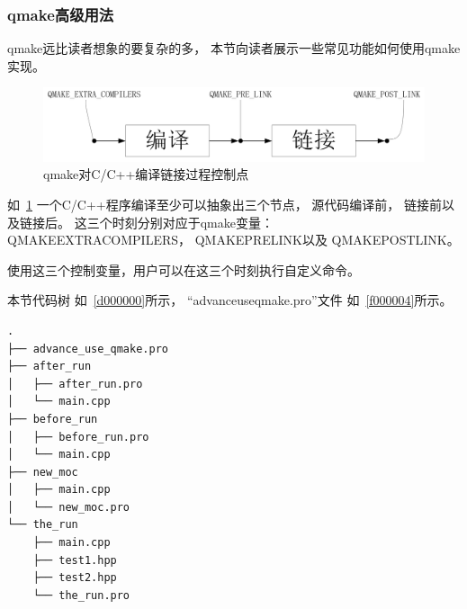
\subsubsection{
qmake高级用法
}\label{ss000810}


qmake远比读者想象的要复杂的多，
本节向读者展示一些常见功能如何使用qmake实现。


\begin{figure}[ht] %
\centering %
\includegraphics[width=\textwidth]{chapter01/images/advance_use_qmake.png} %
\caption{qmake对C/C++编译链接过程控制点} %
\label{p000002} %
\end{figure}


如\figurename\ \ref{p000002}
一个C/C++程序编译至少可以抽象出三个节点，
源代码编译前，
链接前以及链接后。
这三个时刻分别对应于qmake变量：
QMAKE\underline{\hspace{0.5em}}EXTRA\underline{\hspace{0.5em}}COMPILERS，
QMAKE\underline{\hspace{0.5em}}PRE\underline{\hspace{0.5em}}LINK以及
QMAKE\underline{\hspace{0.5em}}POST\underline{\hspace{0.5em}}LINK。

使用这三个控制变量，用户可以在这三个时刻执行自定义命令。

本节代码树
如\treeindexnumbernameone\ \ref{d000000}所示，
“advance\underline{\hspace{0.5em}}use\underline{\hspace{0.5em}}qmake.pro”文件
如\lstlistingname\ \ref{f000004}所示。

\label{d000000}    %
\begin{lstlisting}[caption=GoodLuck,
numbers=none,
title=\treeindexnumbernameone \thetreeindexnumber
]
.
├── advance_use_qmake.pro
├── after_run
│   ├── after_run.pro
│   └── main.cpp
├── before_run
│   ├── before_run.pro
│   └── main.cpp
├── new_moc
│   ├── main.cpp
│   └── new_moc.pro
└── the_run
    ├── main.cpp
    ├── test1.hpp
    ├── test2.hpp
    └── the_run.pro
\end{lstlisting}          %

